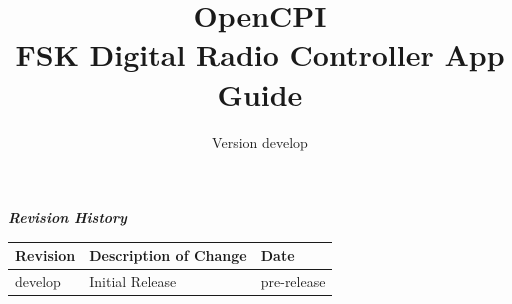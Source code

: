 \def\docTitle{OpenCPI\\ FSK Digital Radio Controller App Guide}
\def\docVersion{\color{red}develop} %

\date{Version \docVersion} %
\title{\docTitle}
\usepackage{graphicx}
\graphicspath{ {figures/} }
\usepackage{textcomp}
\usepackage{listings}


\maketitle

\begin{center}
  \textit{\textbf{Revision History}}
  \begin{longtable}{|p{2cm}|p{12cm}|p{2.4cm}|}
    \hline
    \rowcolor{blue}
    \textbf{Revision} & \textbf{Description of Change} & \textbf{Date} \\
    \hline
    \docVersion & Initial Release & \color{red}pre-release \\
    \hline
  \end{longtable}
\end{center}

